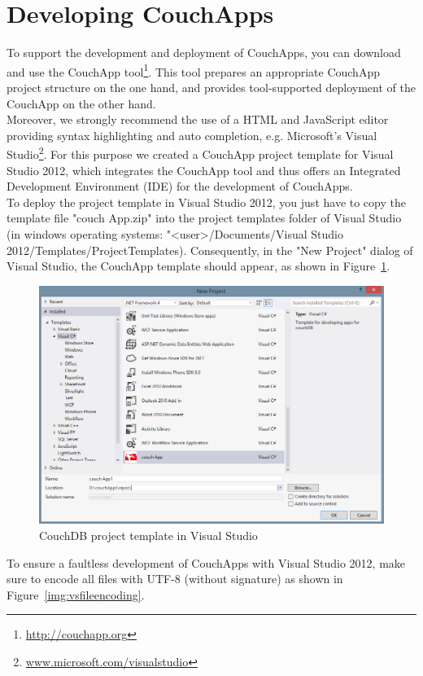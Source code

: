 \section{Developing CouchApps}
\label{couchapp:development}
To support the development and deployment of CouchApps, you can download and use the CouchApp tool\footnote{\url{http://couchapp.org}}. This tool prepares an appropriate CouchApp project structure on the one hand, and provides tool-supported deployment of the CouchApp on the other hand.\\
Moreover, we strongly recommend the use of a HTML and JavaScript editor providing syntax highlighting and auto completion, e.g. Microsoft's Visual Studio\footnote{\url{www.microsoft.com/visualstudio}}. For this purpose we created a CouchApp project template for Visual Studio 2012, which integrates the CouchApp tool and thus offers an Integrated Development Environment (IDE) for the development of CouchApps.\\
To deploy the project template in Visual Studio 2012, you just have to copy the template file "couch App.zip" into the project templates folder of Visual Studio (in windows operating systems: "<user>/Documents/Visual Studio 2012/Templates/ProjectTemplates). Consequently, in the "New Project" dialog of Visual Studio, the CouchApp template should appear, as shown in Figure~\ref{img:vsprojecttemplate}.
\begin{figure}[t!]
\centering
\includegraphics[width=0.75\columnwidth]{images/VSprojecttemplate.png}
\caption{CouchDB project template in Visual Studio}
\label{img:vsprojecttemplate}
\end{figure}
To ensure a faultless development of CouchApps with Visual Studio 2012, make sure to encode all files with UTF-8 (without signature) as shown in Figure~\ref{img:vsfileencoding}.

